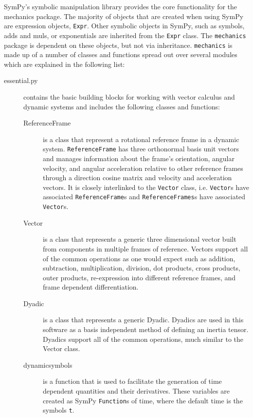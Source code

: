 \documentclass[twocolumn,10pt, final]{asme2e}
\begin{document}
SymPy's symbolic manipulation library provides the core functionality for the
mechanics package. The majority of objects that are created when using SymPy
are expression objects, \verb|Expr|. Other symbolic objects in SymPy, such as
symbols, adds and muls, or exponentials are inherited from the \verb|Expr|
class. The \verb|mechanics| package is dependent on these objects, but not via
inheritance. \verb|mechanics| is made up of a number of classes and functions
spread out over several modules which are explained in the following list:
%
\begin{description}
  \item[essential.py] contains the basic building blocks for working with
    vector calculus and dynamic systems and includes the following classes and
    functions:
    \begin{description}
      \item[ReferenceFrame] is a class that represent a rotational reference
        frame in a dynamic system. \verb|ReferenceFrame| has three orthonormal
        basis unit vectors and manages information about the frame's
        orientation, angular velocity, and angular acceleration relative to
        other reference frames through a direction cosine matrix and velocity
        and acceleration vectors. It is closely interlinked to the
        \verb|Vector| class, i.e. \verb|Vector|s have associated
        \verb|ReferenceFrame|s and \verb|ReferenceFrames|s have associated
        \verb|Vector|s.
      \item[Vector] is a class that represents a generic three dimensional
        vector built from components in multiple frames of reference. Vectors
        support all of the common operations as one would expect such as
        addition, subtraction, multiplication, division, dot products, cross
        products, outer products, re-expression into different reference
        frames, and frame dependent differentiation.
      \item[Dyadic] is a class that represents a generic Dyadic. Dyadics are
        used in this software as a basis independent method of defining an
        inertia tensor. Dyadics support all of the common operations, much
        similar to the Vector class.
      \item[dynamicsymbols] is a function that is used to facilitate the generation
        of time dependent quantities and their derivatives. These variables are
        created as SymPy \verb|Function|s of time, where the default time is
        the symbols \verb|t|.

\end{description}
\end{description}
\end{document}
